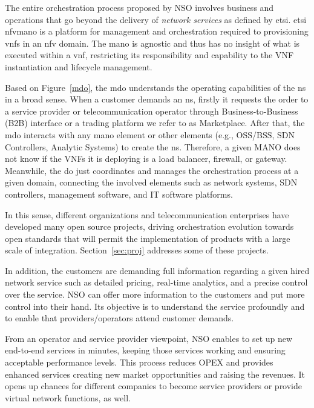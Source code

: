 The entire orchestration process proposed by NSO involves business and operations that go beyond the delivery of \textit{network services} as defined by \gls{etsi}. \gls{etsi} \gls{nfvmano} is a platform for management and orchestration required to provisioning \glspl{vnf} in an \gls{nfv} domain. The \gls{mano} is agnostic and thus has no insight of what is executed within a \gls{vnf}, restricting its responsibility and capability to the VNF instantiation and lifecycle management.

Based on Figure~\ref{mdo}, the \gls{mdo} understands the operating capabilities of the \gls{ns} in a broad sense. When a customer demands an \gls{ns}, firstly it requests the order to a service provider or telecommunication operator through Business-to-Business (B2B) interface or a trading platform we refer to as Marketplace. After that, the \gls{mdo} interacts with any \gls{mano} element or other elements (e.g., OSS/BSS, SDN Controllers, Analytic Systems)  to create the \gls{ns}. Therefore, a given MANO does not know if the VNFs it is deploying is a load balancer, firewall, or gateway. Meanwhile, the \gls{do} just coordinates and manages the orchestration process at a given domain, connecting the involved elements such as network systems, SDN controllers, management software, and IT software platforms.

In this sense, different organizations and telecommunication enterprises have developed many open source projects, driving orchestration evolution towards open standards that will permit the implementation of products with a large scale of integration. Section~\ref{sec:proj} addresses some of these projects.

In addition, the customers are demanding full information regarding a given hired network service such as detailed pricing, real-time analytics, and a precise control over the service. NSO can offer more information to the customers and put more control into their hand. Its objective is to understand the service profoundly and to enable that providers/operators attend customer demands. 

From an operator and service provider viewpoint, NSO enables to set up new end-to-end services in minutes, keeping those services working and ensuring acceptable performance levels. This process reduces OPEX and provides enhanced services creating new market opportunities and raising the revenues.  It opens up chances for different companies to become service providers or provide virtual network functions, as well.

